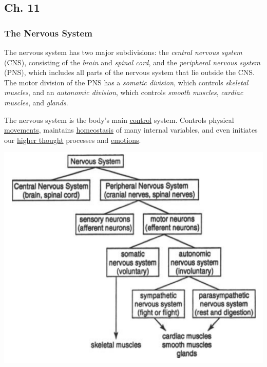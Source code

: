\documentclass[11pt]{article}
\begin{document}
\subsection{Ch. 11}
\label{sec:orgf21f3f2}
\subsubsection{The Nervous System}
\label{sec:org1bd6448}
The nervous system has two major subdivisions: the \emph{central nervous system}
(CNS), consisting of the \emph{brain} and \emph{spinal cord}, and the \emph{peripheral nervous
system} (PNS), which includes all parts of the nervous system that lie
outside the CNS. The motor division of the PNS has a \emph{somatic division}, which
controls \emph{skeletal muscles}, and an \emph{autonomic division}, which controls \emph{smooth
muscles}, \emph{cardiac muscles}, and \emph{glands}.

The nervous system is the body's main \uline{control} system. Controls physical
\uline{movements}, maintains \uline{homeostasis} of many internal variables, and even
initiates our \uline{higher thought} processes and \uline{emotions}.

\begin{center}
\includegraphics[width=.9\linewidth]{./labs/Selection_004_2016-10-03_17-48-16.png}
\end{center}
\end{document}
